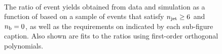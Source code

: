 \begin{figure}[h!]
\begin{center}
    \\
    \caption{The ratio of event yields obtained from data and simulation as a function of \mht [GeV] based on a sample of \mj events that satisfy $n_{\text{jet}} \geq 6$ and $n_{\text{b}} = 0$, as well as the requirements on \scalht indicated by each sub-figure caption. Also shown are fits to the ratios using first-order orthogonal polynomials.}
    \label{fig:mhtval_Mu_ge6j_eq0b}
  \end{center}
\end{figure}

